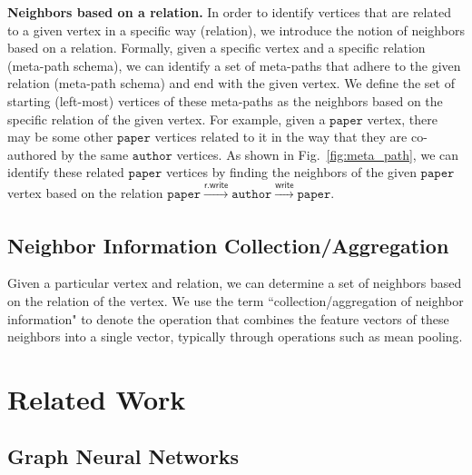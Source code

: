 \documentclass[lettersize,journal]{IEEEtran}
\begin{document}
\textbf{Neighbors based on a relation.}
In order to identify vertices that are related to a given vertex in a specific way (relation), we introduce the notion of neighbors based on a relation.
Formally, given a specific vertex and a specific relation (meta-path schema), we can identify a set of meta-paths that adhere to the given relation (meta-path schema) and end with the given vertex. 
We define the set of starting (left-most) vertices of these meta-paths as the neighbors based on the specific relation of the given vertex.
For example, given a $\mathtt{paper}$ vertex, there may be some other $\mathtt{paper}$ vertices related to it in the way that they are co-authored by the same $\mathtt{author}$ vertices.
As shown in Fig.~\ref{fig:meta_path}, we can identify these related $\mathtt{paper}$ vertices by finding the neighbors of the given $\mathtt{paper}$ vertex based on the relation $\mathtt{paper} \xrightarrow[]{\mathsf{r.write}} \mathtt{author} \xrightarrow[]{\mathsf{write}} \mathtt{paper}$.


\subsection{Neighbor Information Collection/Aggregation}
Given a particular vertex and relation, we can determine a set of neighbors based on the relation of the vertex.
We use the term ``collection/aggregation of neighbor information" to denote the operation that combines the feature vectors of these neighbors into a single vector, typically through operations such as mean pooling.









  
\section{Related Work}

\subsection{Graph Neural Networks}
\end{document}
